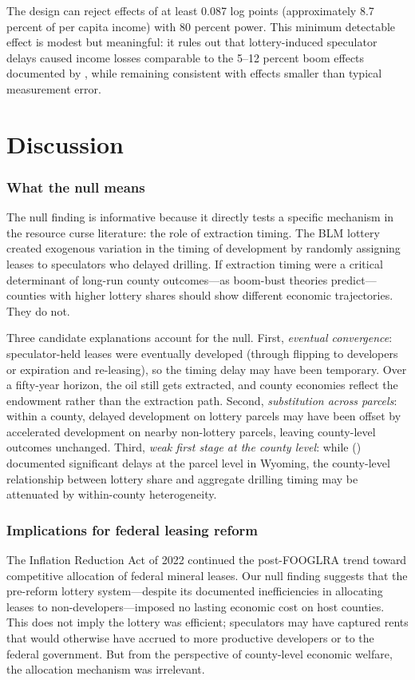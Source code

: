 \documentclass[12pt]{article}
\begin{document}
The design can reject effects of at least 0.087 log points (approximately 8.7 percent of per capita income) with 80 percent power. This minimum detectable effect is modest but meaningful: it rules out that lottery-induced speculator delays caused income losses comparable to the 5--12 percent boom effects documented by \citet{allcott2018dutch}, while remaining consistent with effects smaller than typical measurement error.




\section{Discussion}

\subsubsection*{What the null means} The null finding is informative because it directly tests a specific mechanism in the resource curse literature: the role of extraction timing. The BLM lottery created exogenous variation in the timing of development by randomly assigning leases to speculators who delayed drilling. If extraction timing were a critical determinant of long-run county outcomes---as boom-bust theories predict---counties with higher lottery shares should show different economic trajectories. They do not.

Three candidate explanations account for the null. First, \textit{eventual convergence}: speculator-held leases were eventually developed (through flipping to developers or expiration and re-leasing), so the timing delay may have been temporary. Over a fifty-year horizon, the oil still gets extracted, and county economies reflect the endowment rather than the extraction path. Second, \textit{substitution across parcels}: within a county, delayed development on lottery parcels may have been offset by accelerated development on nearby non-lottery parcels, leaving county-level outcomes unchanged. Third, \textit{weak first stage at the county level}: while \citeauthor{brehm2021speculator} (\citeyear{brehm2021speculator}) documented significant delays at the parcel level in Wyoming, the county-level relationship between lottery share and aggregate drilling timing may be attenuated by within-county heterogeneity.

\subsubsection*{Implications for federal leasing reform} The Inflation Reduction Act of 2022 continued the post-FOOGLRA trend toward competitive allocation of federal mineral leases. Our null finding suggests that the pre-reform lottery system---despite its documented inefficiencies in allocating leases to non-developers---imposed no lasting economic cost on host counties. This does not imply the lottery was efficient; speculators may have captured rents that would otherwise have accrued to more productive developers or to the federal government. But from the perspective of county-level economic welfare, the allocation mechanism was irrelevant.
\end{document}
